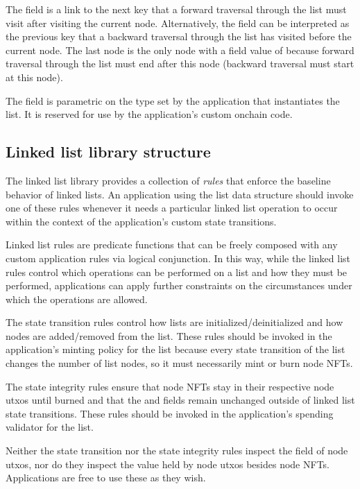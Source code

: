 \documentclass[../midgard.tex]{subfiles}
\begin{document}
The  field is a link to the next key that a forward traversal through the list must visit after visiting the current node.
Alternatively, the  field can be interpreted as the previous key that a backward traversal through the list has visited before the current node.
The last node is the only node with a  field value of  because forward traversal through the list must end after this node (backward traversal must start at this node).

The  field is parametric on the  type set by the application that instantiates the list.
It is reserved for use by the application's custom onchain code.

\subsection{Linked list library structure}
\label{h:list-library-structure}

The linked list library provides a collection of \emph{rules} that enforce the baseline behavior of linked lists.
An application using the list data structure should invoke one of these rules whenever it needs a particular linked list operation to occur within the context of the application's custom state transitions.

Linked list rules are predicate functions that can be freely composed with any custom application rules via logical conjunction.
In this way, while the linked list rules control which operations can be performed on a list and how they must be performed, applications can apply further constraints on the circumstances under which the operations are allowed.

The state transition rules control how lists are initialized/deinitialized and how nodes are added/removed from the list.
These rules should be invoked in the application's minting policy for the list because every state transition of the list changes the number of list nodes, so it must necessarily mint or burn node NFTs.

The state integrity rules ensure that node NFTs stay in their respective node utxos until burned and that the  and  fields remain unchanged outside of linked list state transitions.
These rules should be invoked in the application's spending validator for the list.

Neither the state transition nor the state integrity rules inspect the  field of node utxos, nor do they inspect the value held by node utxos besides node NFTs.
Applications are free to use these as they wish.
\end{document}
